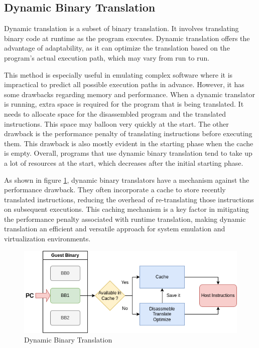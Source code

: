 \subsection{Dynamic Binary Translation}
Dynamic translation is a subset of binary translation.
It involves translating binary code at runtime as the program executes.
Dynamic translation offers the advantage of adaptability, as it can optimize the translation based on the program's actual execution path, which may vary from run to run.

This method is especially useful in emulating complex software where it is impractical to predict all possible execution paths in advance.
However, it has some drawbacks regarding memory and performance.
When a dynamic translator is running, extra space is required for the program that is being translated.
It needs to allocate space for the disassembled program and the translated instructions.
This space may balloon very quickly at the start.
The other drawback is the performance penalty of translating instructions before executing them.
This drawback is also mostly evident in the starting phase when the cache is empty.
Overall, programs that use dynamic binary translation tend to take up a lot of resources at the start, which decreases after the initial starting phase.

As shown in figure \ref{fig:dynamic_binary_translation}, dynamic binary translators have a mechanism against the performance drawback.
They often incorporate a cache to store recently translated instructions, reducing the overhead of re-translating those instructions on subsequent executions. 
This caching mechanism is a key factor in mitigating the performance penalty associated with runtime translation, making dynamic translation an efficient and versatile approach for system emulation and virtualization environments.

\begin{figure}[ht]
    \centering
    \includegraphics[width=0.8\linewidth]{figures/dyn_bin_trans}
    \caption{Dynamic Binary Translation}
    \label{fig:dynamic_binary_translation}
\end{figure}

